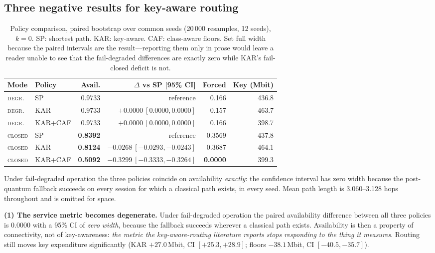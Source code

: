\documentclass[conference]{IEEEtran}
\begin{document}
\subsection{Three negative results for key-aware routing}\label{sec:routing}
\begin{table}[t]
\caption{Policy comparison, paired bootstrap over common seeds (20\,000
resamples, 12 seeds), $k=0$. SP: shortest path. KAR: key-aware. CAF: class-aware
floors. Set full width because the paired intervals are the result---reporting
them only in prose would leave a reader unable to see that the fail-degraded
differences are exactly zero while KAR's fail-closed deficit is not.}
\label{tab:policy}
\centering\footnotesize
\begin{tabular}{@{}llrrrr@{}}
\toprule
Mode & Policy & Avail. & $\Delta$ vs SP [95\% CI] & Forced & Key (Mbit)\\
\midrule
\textsc{degr.} & SP      & 0.9733 & reference & 0.166 & 436.8\\
\textsc{degr.} & KAR     & 0.9733 & $+0.0000\ [0.0000,0.0000]$ & 0.157 & 463.7\\
\textsc{degr.} & KAR+CAF & 0.9733 & $+0.0000\ [0.0000,0.0000]$ & 0.166 & 398.7\\
\midrule
\textsc{closed} & SP      & \textbf{0.8392} & reference & 0.3569 & 437.8\\
\textsc{closed} & KAR     & \textbf{0.8124} & $\mathbf{-0.0268\ [-0.0293,-0.0243]}$ & 0.3687 & 464.1\\
\textsc{closed} & KAR+CAF & \textbf{0.5092} & $\mathbf{-0.3299\ [-0.3333,-0.3264]}$ & \textbf{0.0000} & 399.3\\
\bottomrule
\end{tabular}
\begin{flushleft}\footnotesize
Under fail-degraded operation the three policies coincide on availability
\emph{exactly}: the confidence interval has zero width because the post-quantum
fallback succeeds on every session for which a classical path exists, in every
seed. Mean path length is 3.060--3.128 hops throughout and is omitted for space.
\end{flushleft}
\end{table}

\textbf{(1) The service metric becomes degenerate.} Under fail-degraded operation
the paired availability difference between all three policies is $0.0000$ with a
95\% CI of \emph{zero width}, because the fallback succeeds wherever a classical
path exists. Availability is then a property of connectivity, not of
key-awareness: \emph{the metric the key-aware-routing literature reports stops
responding to the thing it measures}. Routing still moves key expenditure
significantly (KAR $+27.0$\,Mbit, CI $[+25.3,+28.9]$; floors $-38.1$\,Mbit, CI
$[-40.5,-35.7]$).
\end{document}
